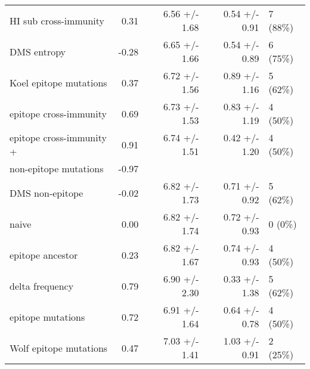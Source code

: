 \begin{tabular*}{1.0\textwidth}{lrrrl}
             HI sub cross-immunity &         0.31 &                          6.56 +/- 1.68 &                                   0.54 +/- 0.91 &                               7 (88\%) \\
                       DMS entropy &        -0.28 &                          6.65 +/- 1.66 &                                   0.54 +/- 0.89 &                               6 (75\%) \\
            Koel epitope mutations &         0.37 &                          6.72 +/- 1.56 &                                   0.89 +/- 1.16 &                               5 (62\%) \\
            epitope cross-immunity &         0.69 &                          6.73 +/- 1.53 &                                   0.83 +/- 1.19 &                               4 (50\%) \\
          epitope cross-immunity + &         0.91 &                          6.74 +/- 1.51 &                                   0.42 +/- 1.20 &                               4 (50\%) \\
 \hspace{3mm}non-epitope mutations &        -0.97 &                                        &                                                 &                                        \\
                   DMS non-epitope &        -0.02 &                          6.82 +/- 1.73 &                                   0.71 +/- 0.92 &                               5 (62\%) \\
                             naive &         0.00 &                          6.82 +/- 1.74 &                                   0.72 +/- 0.93 &                                0 (0\%) \\
                  epitope ancestor &         0.23 &                          6.82 +/- 1.67 &                                   0.74 +/- 0.93 &                               4 (50\%) \\
                   delta frequency &         0.79 &                          6.90 +/- 2.30 &                                   0.33 +/- 1.38 &                               5 (62\%) \\
                 epitope mutations &         0.72 &                          6.91 +/- 1.64 &                                   0.64 +/- 0.78 &                               4 (50\%) \\
            Wolf epitope mutations &         0.47 &                          7.03 +/- 1.41 &                                   1.03 +/- 0.91 &                               2 (25\%) \\

\end{tabular*}
